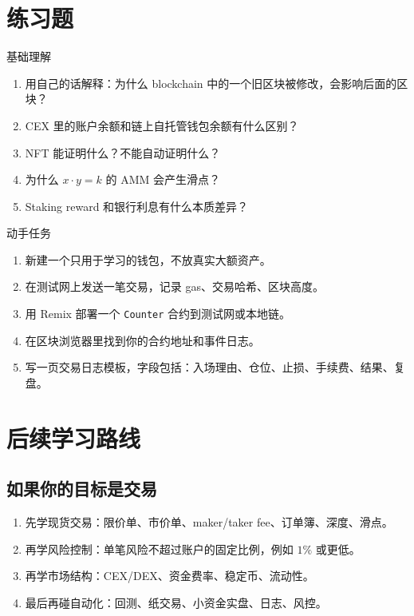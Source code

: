 \documentclass[UTF8,11pt]{ctexart}
\begin{document}
\section{练习题}

\begin{practicebox}{基础理解}
\begin{enumerate}
  \item 用自己的话解释：为什么 blockchain 中的一个旧区块被修改，会影响后面的区块？
  \item CEX 里的账户余额和链上自托管钱包余额有什么区别？
  \item NFT 能证明什么？不能自动证明什么？
  \item 为什么 \(x\cdot y=k\) 的 AMM 会产生滑点？
  \item Staking reward 和银行利息有什么本质差异？
\end{enumerate}
\end{practicebox}

\begin{practicebox}{动手任务}
\begin{enumerate}
  \item 新建一个只用于学习的钱包，不放真实大额资产。
  \item 在测试网上发送一笔交易，记录 gas、交易哈希、区块高度。
  \item 用 Remix 部署一个 \texttt{Counter} 合约到测试网或本地链。
  \item 在区块浏览器里找到你的合约地址和事件日志。
  \item 写一页交易日志模板，字段包括：入场理由、仓位、止损、手续费、结果、复盘。
\end{enumerate}
\end{practicebox}

\section{后续学习路线}

\subsection{如果你的目标是交易}

\begin{enumerate}
  \item 先学现货交易：限价单、市价单、maker/taker fee、订单簿、深度、滑点。
  \item 再学风险控制：单笔风险不超过账户的固定比例，例如 \(1\%\) 或更低。
  \item 再学市场结构：CEX/DEX、资金费率、稳定币、流动性。
  \item 最后再碰自动化：回测、纸交易、小资金实盘、日志、风控。
\end{enumerate}
\end{document}
